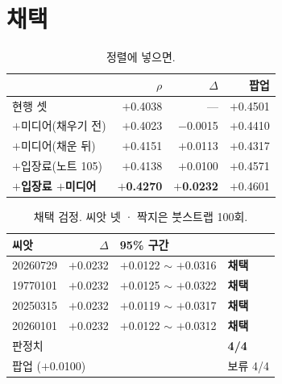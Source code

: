 \documentclass[10pt]{article}
\begin{document}

\section{채택}

\begin{table}[t]
\centering\tsize
\caption{정렬에 넣으면.}
\begin{tabular}{lrrr}
\toprule
& $\rho$ & $\Delta$ & 팝업 \\
\midrule
현행 셋 & $+$0.4038 & --- & $+$0.4501 \\
$+$미디어(채우기 전) & $+$0.4023 & $-$0.0015 & $+$0.4410 \\
$+$미디어(채운 뒤) & $+$0.4151 & $+$0.0113 & $+$0.4317 \\
$+$입장료(노트 105) & $+$0.4138 & $+$0.0100 & $+$0.4571 \\
\textbf{$+$입장료 $+$미디어} & \textbf{$+$0.4270} & \textbf{$+$0.0232} &
$+$0.4601 \\
\bottomrule
\end{tabular}
\end{table}

\begin{table}[t]
\centering\tsize
\caption{채택 검정. 씨앗 넷 · 짝지은 붓스트랩 100회.}
\begin{tabular}{lrll}
\toprule
씨앗 & $\Delta$ & 95\% 구간 & \\
\midrule
20260729 & $+$0.0232 & $+$0.0122 $\sim$ $+$0.0316 & \textbf{채택} \\
19770101 & $+$0.0232 & $+$0.0125 $\sim$ $+$0.0322 & \textbf{채택} \\
20250315 & $+$0.0232 & $+$0.0119 $\sim$ $+$0.0317 & \textbf{채택} \\
20260101 & $+$0.0232 & $+$0.0122 $\sim$ $+$0.0312 & \textbf{채택} \\
\midrule
\multicolumn{3}{l}{판정치} & \textbf{4/4} \\
\multicolumn{3}{l}{팝업 ($+$0.0100)} & 보류 4/4 \\
\bottomrule
\end{tabular}
\end{table}
\end{document}

